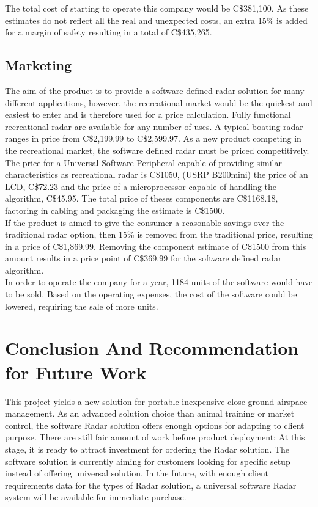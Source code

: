 \documentclass[letterpaper, 12 pt, conference]{report}
\numberwithin{figure}{section}
\begin{document}
The total cost of starting to operate this company would be C\$381,100.  As these estimates do not reflect all the real and unexpected costs, an extra 15\% is added for a margin of safety resulting in a total of C\$435,265.\\
\subsection{Marketing}
The aim of the product is to provide a software defined radar solution for many different applications, however, the recreational market would be the quickest and easiest to enter and is therefore used for a price calculation. Fully functional recreational radar are available for any number of uses. A typical boating radar ranges in price from C\$2,199.99 to C\$2,599.97. \cite{_cabelas_????}  As a new product competing in the recreational market, the software defined radar must be priced competitively. The price for a Universal Software Peripheral capable of providing similar characteristics as recreational radar is C\$1050, \cite{_usrp_????}(USRP B200mini) the price of an LCD, C\$72.23 \cite{_sharp_????}and the price of a microprocessor capable of handling the algorithm, C\$45.95. \cite{_arduino_????}The total price of theses components are C\$1168.18, factoring in cabling and packaging the estimate is C\$1500.  \\

If the product is aimed to give the consumer a reasonable savings over the traditional radar option, then 15\% is removed from the traditional price, resulting in a price of C\$1,869.99. Removing the component estimate of C\$1500 from this amount results in a price point of C\$369.99 for the software defined radar algorithm.\\

In order to operate the company for a year, 1184 units of the software would have to be sold.  Based on the operating expenses, the cost of the software could be lowered, requiring the sale of more units.\\
\newpage
\section{Conclusion And Recommendation for Future Work}
This project yields a new solution for portable inexpensive close ground airspace management. As an advanced solution choice than animal training or market control, the software Radar solution offers enough options for adapting to client purpose. There are still fair amount of work before product deployment; At this stage, it is ready to attract investment for ordering the Radar solution. The software solution is currently aiming for customers looking for specific setup instead of offering universal solution. In the future, with enough client requirements data for the types of Radar solution, a universal software Radar system will be available for immediate purchase. \\
\end{document}
